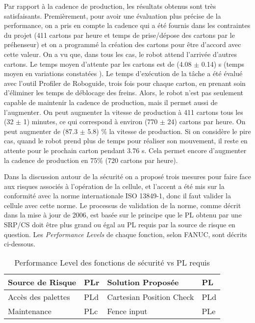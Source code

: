 Par rapport à la cadence de production, les résultats obtenus sont très satisfaisants. Premièrement, pour avoir une évaluation plus précise de la performance, on a pris en compte la cadence qui a été fournis dans les contraintes du projet (411 cartons par heure et temps de prise/dépose des cartons par le préhenseur) et on a programmé la création des cartons pour être d’accord avec cette valeur. On a vu que, dans tous les cas, le robot attend l’arrivée d’autres cartons.
Le temps moyen d’attente par les cartons est de (4.08 $ \pm $ 0.14) s  (temps moyen en variations constatées ). Le temps d’exécution de la tâche a été évalué avec l’outil Profiler de Roboguide, trois fois pour chaque carton, en prenant soin d’éliminer les temps de déblocage des freins. Alors, le robot n’est pas seulement capable de maintenir la cadence de production, mais il permet aussi de l’augmenter. On peut augmenter la vitesse de production à 411 cartons tous les (32 $ \pm $ 1)  minutes, ce qui correspond à environ (770 $ \pm $ 24) cartons par heure. On peut augmenter de (87.3 $ \pm $ 5.8) \% la vitesse de production.
Si on considère le pire cas, quand le robot prend plus de temps pour réaliser son mouvement, il reste en attente pour le prochain carton pendant 3.76 s. Cela permet encore d’augmenter la cadence de production en 75\% (720 cartons par heure). 



\newpage
{}
Dans la discussion autour de la sécurité on a proposé trois mesures pour faire face aux risques associés à l'opération de la cellule, et l’accent a été mis sur la conformité avec la norme internationale ISO 13849-1, donc il faut valider la cellule avec cette norme.
Le processus de validation de la norme, comme décrit dans la mise à jour de 2006, est basée sur le principe que le PL obtenu par une SRP/CS doit être plus grand ou égal au PL requis par la source de risque en question. Les \textit{Performance Levels} de chaque fonction, selon FANUC, sont décrits ci-dessous. 

\begin{table}[H]
	\caption{Performance Level des fonctions de sécurité vs PL requis}
	\label{tab:Performance_Level}
	\begin{tabularx}{\textwidth}{>{\centering\arraybackslash}X|>{\centering\arraybackslash}X|>{\centering\arraybackslash}X|>{\centering\arraybackslash}X}
		\textbf{Source de Risque}&
		\textbf{PLr}&
		\textbf{Solution Proposée}&
		\textbf{PL}\\
		\hline		
		Accès des palettes&
		PLd&
		Cartesian Position Check&
		PLd\\
		\hline		
		Maintenance&
		PLc&
		Fence input&
		PLe\\		
	\end{tabularx}
\end{table}

